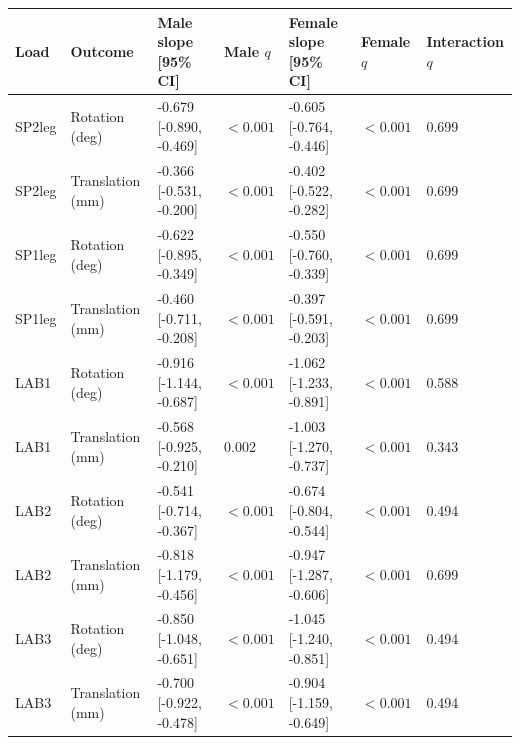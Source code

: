 \begin{tabular}{lllllll}
\toprule
Load & Outcome & Male slope [95\% CI] & Male $q$ & Female slope [95\% CI] & Female $q$ & Interaction $q$ \\
\midrule
SP2leg & Rotation (deg) & -0.679 [-0.890, -0.469] & $<0.001$ & -0.605 [-0.764, -0.446] & $<0.001$ & 0.699 \\
SP2leg & Translation (mm) & -0.366 [-0.531, -0.200] & $<0.001$ & -0.402 [-0.522, -0.282] & $<0.001$ & 0.699 \\
SP1leg & Rotation (deg) & -0.622 [-0.895, -0.349] & $<0.001$ & -0.550 [-0.760, -0.339] & $<0.001$ & 0.699 \\
SP1leg & Translation (mm) & -0.460 [-0.711, -0.208] & $<0.001$ & -0.397 [-0.591, -0.203] & $<0.001$ & 0.699 \\
LAB1 & Rotation (deg) & -0.916 [-1.144, -0.687] & $<0.001$ & -1.062 [-1.233, -0.891] & $<0.001$ & 0.588 \\
LAB1 & Translation (mm) & -0.568 [-0.925, -0.210] & 0.002 & -1.003 [-1.270, -0.737] & $<0.001$ & 0.343 \\
LAB2 & Rotation (deg) & -0.541 [-0.714, -0.367] & $<0.001$ & -0.674 [-0.804, -0.544] & $<0.001$ & 0.494 \\
LAB2 & Translation (mm) & -0.818 [-1.179, -0.456] & $<0.001$ & -0.947 [-1.287, -0.606] & $<0.001$ & 0.699 \\
LAB3 & Rotation (deg) & -0.850 [-1.048, -0.651] & $<0.001$ & -1.045 [-1.240, -0.851] & $<0.001$ & 0.494 \\
LAB3 & Translation (mm) & -0.700 [-0.922, -0.478] & $<0.001$ & -0.904 [-1.159, -0.649] & $<0.001$ & 0.494 \\
\bottomrule
\end{tabular}
